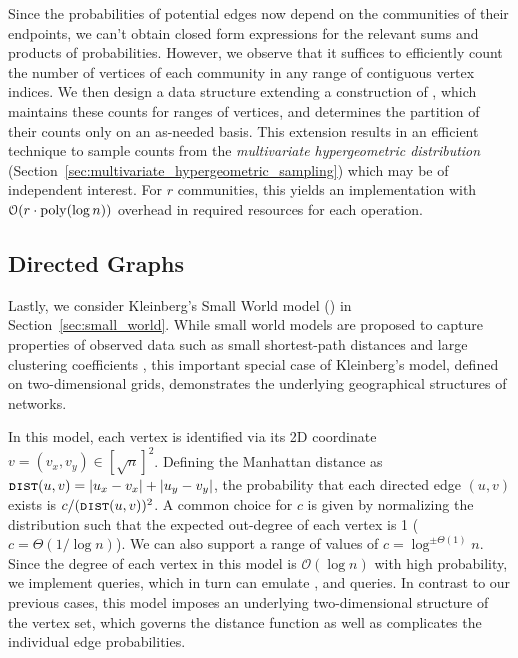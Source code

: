 Since the probabilities of potential edges now depend on the communities of their endpoints,
we can't obtain closed form expressions for the relevant sums and products of probabilities.
However, we observe that it suffices to efficiently count the number of vertices of each community in any range of contiguous vertex indices.
We then design a data structure extending a construction of \cite{huge}, which maintains these counts for ranges of vertices,
and determines the partition of their counts only on an as-needed basis.
This extension results in an efficient technique to sample counts from the \emph{multivariate hypergeometric distribution}
(Section~\ref{sec:multivariate_hypergeometric_sampling}) which may be of independent interest.
For $r$ communities, this yields an implementation with $ \mathcal{O}(r\cdot \mathrm{poly}(\log n))$ overhead in required resources for each operation.




\subsection{Directed Graphs}
\label{sec:directed_graphs}
Lastly, we consider Kleinberg's Small World model (\cite{kleinberg, klein}) in Section~\ref{sec:small_world}.
While small world models are proposed to capture properties of observed data such as small shortest-path
distances and large clustering coefficients \cite{watts1998collective},
this important special case of Kleinberg's model, defined on two-dimensional grids, demonstrates the underlying geographical structures of networks.

In this model, each vertex is identified via its 2D coordinate $v = (v_x, v_y) \in [\sqrt{n}]^2$.
Defining the Manhattan distance as $\texttt{\textsc{dist}}(u,v)=|u_x-v_x|+|u_y-v_y|$,
the probability that each directed edge $(u,v)$ exists is $c/(\texttt{\textsc{dist}}(u,v))^{2}$.
A common choice for $c$ is given by normalizing the distribution such that the expected out-degree of each vertex is 1 ($c = \Theta(1/\log n)$).
We can also support a range of values of $c=\log^{\pm\Theta(1)}n$.
Since the degree of each vertex in this model is $\mathcal O(\log n)$ with high probability, we implement  queries,
which in turn can emulate ,  and  queries.
In contrast to our previous cases, this model imposes an underlying two-dimensional structure of the vertex set,
which governs the distance function as well as complicates the individual edge probabilities.


